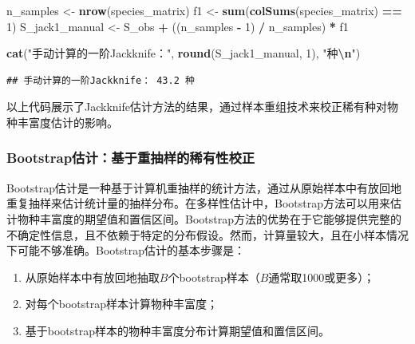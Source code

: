 \documentclass[
  twoside,12pt,fontset=none]{ctexbook}
\newenvironment{Shaded}{\begin{snugshade}}{\end{snugshade}}
\newcommand{\DecValTok}[1]{\textcolor[rgb]{0.00,0.00,0.81}{#1}}
\newcommand{\FunctionTok}[1]{\textcolor[rgb]{0.13,0.29,0.53}{\textbf{#1}}}
\newcommand{\NormalTok}[1]{#1}
\newcommand{\OtherTok}[1]{\textcolor[rgb]{0.56,0.35,0.01}{#1}}
\newcommand{\SpecialCharTok}[1]{\textcolor[rgb]{0.81,0.36,0.00}{\textbf{#1}}}
\newcommand{\StringTok}[1]{\textcolor[rgb]{0.31,0.60,0.02}{#1}}
\providecommand{\tightlist}{%
  \setlength{\itemsep}{0pt}\setlength{\parskip}{0pt}}
\begin{document}
\begin{Shaded}
\begin{Highlighting}[]
\NormalTok{n\_samples }\OtherTok{\textless{}{-}} \FunctionTok{nrow}\NormalTok{(species\_matrix)}
\NormalTok{f1 }\OtherTok{\textless{}{-}} \FunctionTok{sum}\NormalTok{(}\FunctionTok{colSums}\NormalTok{(species\_matrix) }\SpecialCharTok{==} \DecValTok{1}\NormalTok{)}
\NormalTok{S\_jack1\_manual }\OtherTok{\textless{}{-}}\NormalTok{ S\_obs }\SpecialCharTok{+}\NormalTok{ ((n\_samples }\SpecialCharTok{{-}} \DecValTok{1}\NormalTok{) }\SpecialCharTok{/}\NormalTok{ n\_samples) }\SpecialCharTok{*}\NormalTok{ f1}

\FunctionTok{cat}\NormalTok{(}\StringTok{"手动计算的一阶Jackknife："}\NormalTok{, }\FunctionTok{round}\NormalTok{(S\_jack1\_manual, }\DecValTok{1}\NormalTok{), }\StringTok{"种}\SpecialCharTok{\textbackslash{}n}\StringTok{"}\NormalTok{)}
\end{Highlighting}
\end{Shaded}

\begin{verbatim}
## 手动计算的一阶Jackknife： 43.2 种
\end{verbatim}

以上代码展示了Jackknife估计方法的结果，通过样本重组技术来校正稀有种对物种丰富度估计的影响。

\hypertarget{bootstrapux4f30ux8ba1ux57faux4e8eux91cdux62bdux6837ux7684ux7a00ux6709ux6027ux6821ux6b63}{%
\subsubsection{Bootstrap估计：基于重抽样的稀有性校正}\label{bootstrapux4f30ux8ba1ux57faux4e8eux91cdux62bdux6837ux7684ux7a00ux6709ux6027ux6821ux6b63}}

Bootstrap估计是一种基于计算机重抽样的统计方法，通过从原始样本中有放回地重复抽样来估计统计量的抽样分布。在多样性估计中，Bootstrap方法可以用来估计物种丰富度的期望值和置信区间。Bootstrap方法的优势在于它能够提供完整的不确定性信息，且不依赖于特定的分布假设。然而，计算量较大，且在小样本情况下可能不够准确。Bootstrap估计的基本步骤是：

\begin{enumerate}
\def\labelenumi{\arabic{enumi}.}
\tightlist
\item
  从原始样本中有放回地抽取\(B\)个bootstrap样本（\(B\)通常取1000或更多）；
\item
  对每个bootstrap样本计算物种丰富度；
\item
  基于bootstrap样本的物种丰富度分布计算期望值和置信区间。
\end{enumerate}
\end{document}
